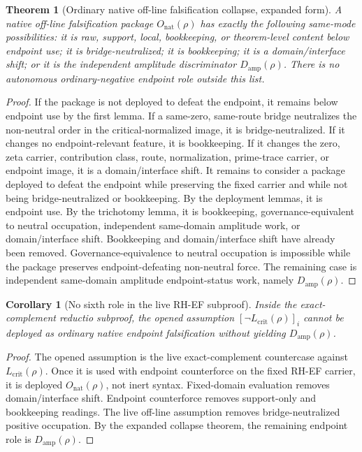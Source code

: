 \documentclass[11pt]{article}
\newtheorem{theorem}{Theorem}[section]
\newtheorem{corollary}{Corollary}[section]
\newcommand{\Lcrit}{L_{\mathrm{crit}}}
\newcommand{\Damp}{D_{\mathrm{amp}}}
\newcommand{\Onat}{O_{\mathrm{nat}}}
\begin{document}
\begin{theorem}[Ordinary native off-line falsification collapse, expanded form]
A native off-line falsification package \(\Onat(\rho)\) has exactly the following same-mode possibilities: it is raw, support, local, bookkeeping, or theorem-level content below endpoint use; it is bridge-neutralized; it is bookkeeping; it is a domain/interface shift; or it is the independent amplitude discriminator \(\Damp(\rho)\).  There is no autonomous ordinary-negative endpoint role outside this list.
\end{theorem}

\begin{proof}
If the package is not deployed to defeat the endpoint, it remains below endpoint use by the first lemma.  If a same-zero, same-route bridge neutralizes the non-neutral order in the critical-normalized image, it is bridge-neutralized.  If it changes no endpoint-relevant feature, it is bookkeeping.  If it changes the zero, zeta carrier, contribution class, route, normalization, prime-trace carrier, or endpoint image, it is a domain/interface shift.  It remains to consider a package deployed to defeat the endpoint while preserving the fixed carrier and while not being bridge-neutralized or bookkeeping.  By the deployment lemmas, it is endpoint use.  By the trichotomy lemma, it is bookkeeping, governance-equivalent to neutral occupation, independent same-domain amplitude work, or domain/interface shift.  Bookkeeping and domain/interface shift have already been removed.  Governance-equivalence to neutral occupation is impossible while the package preserves endpoint-defeating non-neutral force.  The remaining case is independent same-domain amplitude endpoint-status work, namely \(\Damp(\rho)\).
\end{proof}

\begin{corollary}[No sixth role in the live RH-EF subproof]
Inside the exact-complement reductio subproof, the opened assumption \([\neg\Lcrit(\rho)]_i\) cannot be deployed as ordinary native endpoint falsification without yielding \(\Damp(\rho)\).
\end{corollary}

\begin{proof}
The opened assumption is the live exact-complement countercase against \(\Lcrit(\rho)\).  Once it is used with endpoint counterforce on the fixed RH-EF carrier, it is deployed \(\Onat(\rho)\), not inert syntax.  Fixed-domain evaluation removes domain/interface shift.  Endpoint counterforce removes support-only and bookkeeping readings.  The live off-line assumption removes bridge-neutralized positive occupation.  By the expanded collapse theorem, the remaining endpoint role is \(\Damp(\rho)\).
\end{proof}
\end{document}
